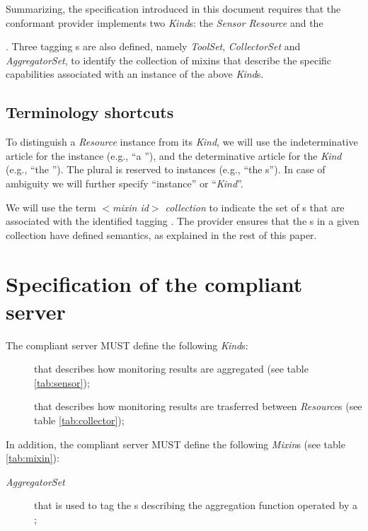 \documentclass[12pt]{article}  %
\begin{document}
Summarizing, the specification introduced in this document requires that the conformant provider implements two {\em Kind}s: the {\em Sensor Resource} and the {\coll. Three tagging \mi s are also defined, namely {\em ToolSet}, {\em CollectorSet} and {\em AggregatorSet}, to identify the collection of mixins that describe the specific capabilities associated with an instance of the above {\em Kind}s. 

\subsection{Terminology shortcuts}

To distinguish a {\em Resource} instance from its {\em Kind}, we will use the indeterminative article for the instance (e.g., ``a \rs''), and the determinative article for the {\em Kind} (e.g., ``the \rs''). The plural is reserved to instances (e.g., ``the \rs s''). In case of ambiguity we will further specify ``instance'' or ``{\em Kind}''. 

We will use the term {\em $<$mixin id$>$ collection} to indicate the set of \mi s that are associated with the identified tagging \mi. The provider ensures that the \mi s in a given collection have defined semantics, as explained in the rest of this paper. 

\section{Specification of the compliant server}

The compliant server MUST define the following {\em Kind}s:

\begin{description}

\item [\sens] that describes how monitoring results are aggregated (see table  \ref{tab:sensor});

\item [\coll] that describes how monitoring results are trasferred between {\em Resource}s (see table \ref{tab:collector});

\end{description}

In addition, the compliant server MUST define the following {\em Mixin}s (see table \ref{tab:mixin}): 

\begin{description}

\item [{\em AggregatorSet}] that is used to tag the \mi s describing the aggregation function operated by a \sens;


\end{description}}
\end{document}

